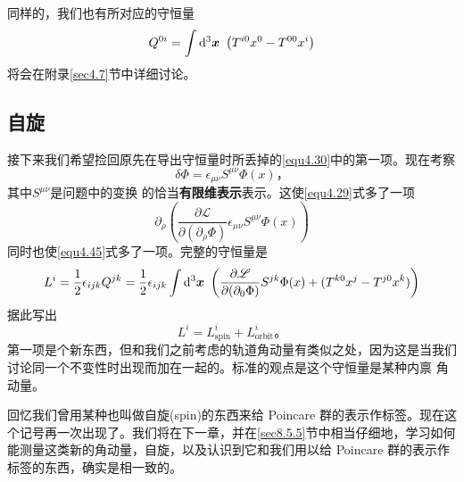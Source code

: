 同样的，我们也有所对应的守恒量
\begin{equation}
Q^{0i}=\int \mathrm d^3 \bm{x}~ \left(T^{i 0} x^0- T^{0 0}x^i\right)
\label{equ4.46}
\end{equation}
将会在附录\ref{sec4.7}节中详细讨论。

\subsection{自旋}\label{sec4.5.4}
接下来我们希望捡回原先在导出守恒量时所丢掉的\ref{equ4.30}中的第一项。现在考察
\begin{equation}
\delta\Phi = \epsilon_{\mu\nu} S^{\mu\nu}\Phi(x) \text{，}
\end{equation}
其中$S^{\mu\nu}$是问题中的变换%
%
的恰当{\bf 有限维表示}表示。这使\ref{equ4.29}式多了一项
\begin{equation}
\partial_\rho \left(\frac{\partial\mathscr L}{\partial (\partial_\rho \Phi)}\epsilon_{\mu\nu}S^{\mu\nu}\Phi(x)\right)
\end{equation}
同时也使\ref{equ4.45}式多了一项。完整的守恒量是
\begin{equation}
L^i = \frac{1}{2}\epsilon_{ijk}Q^{jk} = \frac{1}{2}\epsilon_{ijk} \int \mathrm d^3 \bm{x}~ \left(\frac{\partial\mathscr L}{\partial (\partial_0 \Phi)}S^{jk}\Phi(x) + (T^{k 0} x^j-T^{j 0}x^k)\right)
\end{equation}
据此写出
\begin{equation}
L^i = L_\text{spin}^i + L_\text{orbit}^i \text{。}
\end{equation}
第一项是个新东西，但和我们之前考虑的轨道角动量有类似之处，因为这是当我们讨论同一个不变性时出现而加在一起的。标准的观点是这个守恒量是某种内禀%
%
角动量。

回忆我们曾用某种也叫做自旋(spin)的东西来给 Poincare 群的表示作标签。现在这个记号再一次出现了。我们将在下一章，并在\ref{sec8.5.5}节中相当仔细地，学习如何能测量这类新的角动量，自旋，以及认识到它和我们用以给 Poincare 群的表示作标签的东西，确实是相一致的。

